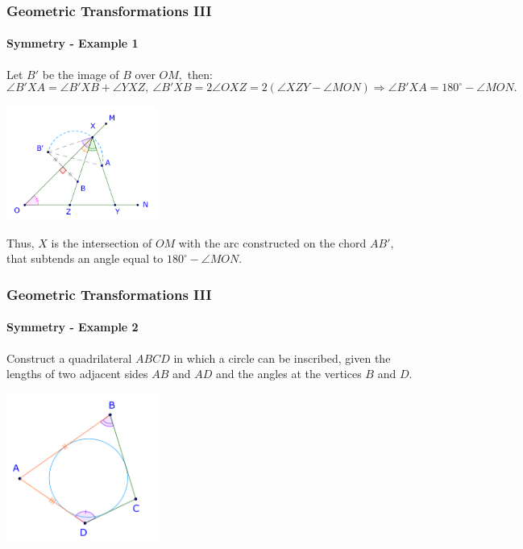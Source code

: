 \documentclass[8pt,xcolor=table,dvipsnames]{beamer}
\newcommand{\dg}{^\circ}
\begin{document}
\begin{frame}[t]
    \frametitle{Geometric Transformations III}
    \framesubtitle{Symmetry - Example 1}
    Let $B'$ be the image of $B$ over $OM,$ then:
    \[
        \angle B'XA = \angle B'XB + \angle YXZ,\  \angle B'XB = 2\angle OXZ = 2(\angle XZY - \angle MON)
        \Rightarrow \angle B'XA = 180\dg - \angle MON.
    \]

    \begin{center}
        \includegraphics[width=5cm]{./svg/pdf/symmetry-1b.pdf}
    \end{center}
    Thus, $X$ is the intersection of $OM$ with the arc constructed on the chord $AB',$ that subtends an angle equal to $180\dg - \angle MON.$
\end{frame}

\begin{frame}[t]
    \frametitle{Geometric Transformations III}
    \framesubtitle{Symmetry - Example 2}
    \begin{example}
        Construct a quadrilateral $ABCD$ in which a circle can be inscribed,
        given the lengths of two adjacent sides $AB$ and $AD$ and the angles at the vertices $B$ and $D.$
    \end{example}

    \begin{center}
        \includegraphics[width=5cm]{./svg/pdf/symmetry-2a.pdf}
    \end{center}
\end{frame}
\end{document}
